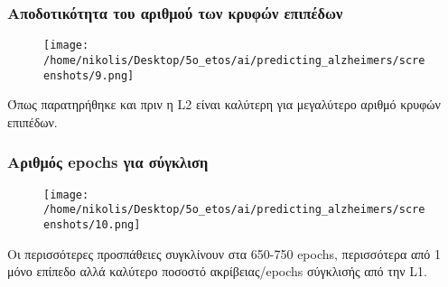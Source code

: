 \documentclass[a4paper,11pt]{article}
\begin{document}
\subsubsection{Αποδοτικότητα του αριθμού των κρυφών επιπέδων}

\begin{figure}[H]
    \centering
    \texttt{[image: /home/nikolis/Desktop/5o\_etos/ai/predicting\_alzheimers/screenshots/9.png]}
    \label{fig:double}
\end{figure}

Όπως παρατηρήθηκε και πριν η L2 είναι καλύτερη για μεγαλύτερο αριθμό κρυφών επιπέδων.

\subsubsection{Αριθμός epochs για σύγκλιση}
\begin{figure}[H]
    \centering
    \texttt{[image: /home/nikolis/Desktop/5o\_etos/ai/predicting\_alzheimers/screenshots/10.png]}
    \label{fig:double}
\end{figure}

Οι περισσότερες προσπάθειες συγκλίνουν στα 650-750 epochs, περισσότερα από 1 μόνο επίπεδο αλλά καλύτερο ποσοστό ακρίβειας/epochs σύγκλισής από την L1. 
\end{document}
